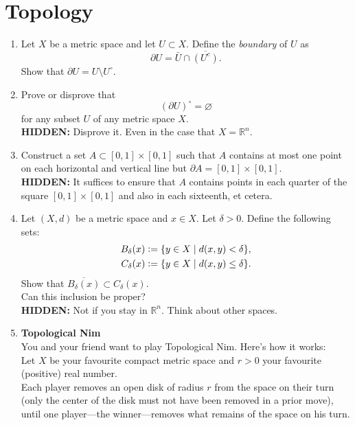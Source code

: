 \documentclass[12pt]{article}
\theoremstyle{definition}
\numberwithin{thm}{section}
\let\emptyset\varnothing
\newcommand{\hint}[1]{\textbf{HIDDEN:} {\color[rgb]{0.95, 0.95, 0.95}#1}}
\begin{document}
\newpage\section{Topology}
\begin{enumerate}
	\item Let $X$ be a metric space and let $U \subset X.$ Define the \emph{boundary} of $U$ as 
	\begin{equation*} 
		\partial U = \bar{U} \cap \overline{(U^c)}.
	\end{equation*}
	Show that $\partial U = U \setminus U^\circ.$
	\item Prove or disprove that
	\begin{equation*} 
		(\partial U)^\circ = \emptyset
	\end{equation*}
	for any subset $U$ of any metric space $X.$\\
	\hint{Disprove it. Even in the case that $X = \mathbb{R}^n.$}
	\item Construct a set $A \subset [0, 1] \times [0, 1]$ such that $A$ contains at most one point on each horizontal and vertical line but $\partial A = [0, 1] \times [0, 1].$\\
	\hint{It suffices to ensure that $A$ contains points in each quarter of the square $[0, 1] \times [0, 1]$ and also in each sixteenth, et cetera.}
	\item Let $(X, d)$ be a metric space and $x \in X.$ Let $\delta > 0.$ Define the following sets:
	\begin{align*} 
	 	B_\delta(x) &\vcentcolon= \{y \in X \mid d(x, y) < \delta\},\\
	 	C_\delta(x) &\vcentcolon= \{y \in X \mid d(x, y) \le \delta\}.
	\end{align*} 
	Show that $\overline{B_\delta(x)} \subset C_\delta(x).$\\
	Can this inclusion be proper?\\
	\hint{Not if you stay in $\mathbb{R}^n.$ Think about other spaces.}
	\item \textbf{Topological Nim}\\
	You and your friend want to play Topological Nim. Here's how it works:\\
	Let $X$ be your favourite compact metric space and $r > 0$ your favourite (positive) real number.\\
	Each player removes an open disk of radius $r$ from the space on their turn (only the center of the disk must not have been removed in a prior move), until one player—the winner—removes what remains of the space on his turn.\\~\\

\end{enumerate}
\end{document}

